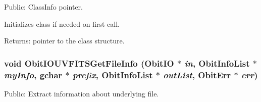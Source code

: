 Public: Class\-Info pointer. 

Initializes class if needed on first call. \begin{Desc}
\item[Returns:]pointer to the class structure. \end{Desc}
\subsubsection{\setlength{\rightskip}{0pt plus 5cm}void Obit\-IOUVFITSGet\-File\-Info ({\bf Obit\-IO} $\ast$ {\em in}, {\bf Obit\-Info\-List} $\ast$ {\em my\-Info}, gchar $\ast$ {\em prefix}, {\bf Obit\-Info\-List} $\ast$ {\em out\-List}, {\bf Obit\-Err} $\ast$ {\em err})}\label{ObitIOUVFITS_8c_a40}


Public: Extract information about underlying file. 


